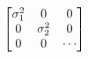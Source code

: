 \documentclass[preview]{standalone}
\begin{document}
\begin{align*}
\special{dvisvgm:raw <g id='unique000'>}\begin{bmatrix} \sigma_1^2 & 0 & 0 \\ 0 & \sigma_2^2 & 0 \\ 0 & 0 & \cdots \end{bmatrix}\special{dvisvgm:raw </g>}
\end{align*}
\end{document}
